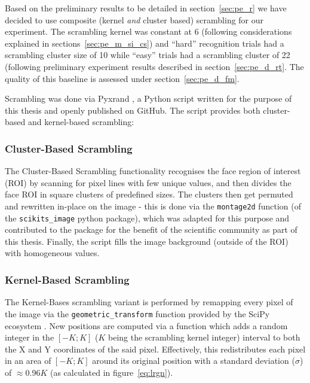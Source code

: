 	    Based on the preliminary results to be detailed in section~\ref{sec:pe_r} we have decided to use composite (kernel \textit{and} cluster based) scrambling for our experiment.
	    The scrambling kernel was constant at \SI{6}{\pixel} (following considerations explained in sections~\ref{sec:pe_m_si_cs}) 
	    and “hard” recognition trials had a scrambling cluster size of \SI{10}{\pixel} while “easy” trials had a scrambling cluster of \SI{22}{\pixel} (following preliminary experiment results described in section~\ref{sec:pe_d_rt}.
	    The quality of this baseline is assessed under section~\ref{sec:pe_d_fm}.
	    
	    Scrambling was done via Pyxrand \citep{pyxrand}, a Python script written for the purpose of this thesis and openly published on GitHub.
	    The script provides both cluster-based and kernel-based scrambling:
	    \subsubsection{Cluster-Based Scrambling}\label{sec:m_vs_si_cs}
		The Cluster-Based Scrambling functionality recognises the face region of interest (ROI) by scanning for pixel lines with few unique values, and then divides the face ROI in square clusters of predefined sizes.
		The clusters then get permuted and rewritten in-place on the image - this is done via the \colorbox{vlg}{\texttt{montage2d}} function (of the \colorbox{vlg}{\texttt{scikits\_image}} python package), which  was adapted for this purpose and contributed to the package for the benefit of the scientific community as part of this thesis.
		Finally, the script fills the image background (outside of the ROI) with homogeneous values.
	    \subsubsection{Kernel-Based Scrambling}\label{sec:m_vs_si_ks}
		The Kernel-Bases scrambling variant is performed by remapping every pixel of the image via the \colorbox{vlg}{\texttt{geometric\_transform}} function provided by the SciPy ecosystem \citep{scipy,Oliphant2007}.
		New positions are computed via a function which adds a random integer in the $[-K;K]$ ($K$ being the scrambling kernel integer) interval to both the X and Y coordinates of the said pixel.
		Effectively, this redistributes each pixel in an area of $[-K;K]$ around its original position with a standard deviation ($\sigma$) of $\approx 0.96K$ (as calculated in figure~\ref{eq:lrgn}).
    
